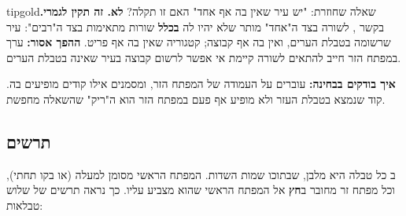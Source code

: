 \documentclass[11pt,a4paper]{article}
\begin{document}
\begin{notepanel}{tipgold}{שאלה שחוזרת: "יש עיר שאין בה אף אחד" \textendash{} האם זו תקלה?}
\textbf{לא. זה תקין לגמרי.} בקשר , לשורה בצד ה"אחד" מותר שלא יהיו לה \textbf{בכלל} שורות מתאימות בצד ה"רבים": עיר שרשומה בטבלת הערים, ואין בה אף קבוצה; קטגוריה שאין בה אף פריט. \textbf{ההפך אסור:} ערך במפתח הזר חייב להתאים לשורה קיימת \textendash{} אי אפשר לרשום קבוצה בעיר שאינה בטבלת הערים.

\vspace{3pt}
\textbf{איך בודקים בבחינה:} עוברים על העמודה של המפתח הזר, ומסמנים אילו קודים מופיעים בה. קוד שנמצא בטבלת העזר ולא מופיע אף פעם במפתח הזר \textendash{} הוא ה"ריק" שהשאלה מחפשת.
\end{notepanel}

\subsection{תרשים }

ב כל טבלה היא מלבן, שבתוכו שמות השדות. המפתח הראשי מסומן למעלה (או בקו תחתי), וכל מפתח זר מחובר ב\textbf{חץ} אל המפתח הראשי שהוא מצביע עליו. כך נראה תרשים של שלוש טבלאות:

\vspace{4pt}
\begin{otherlanguage}{english}
\begin{center}
\end{center}
\end{otherlanguage}
\end{document}
